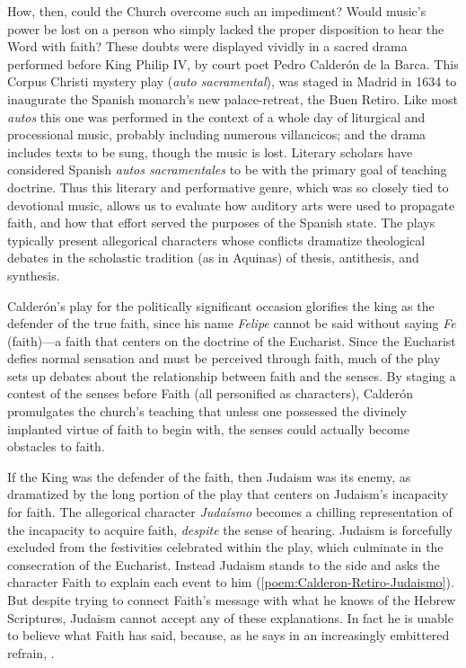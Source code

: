 How, then, could the Church overcome such an impediment?
Would music's power be lost on a person who simply lacked the proper disposition
to hear the Word with faith?
These doubts were displayed vividly in a sacred drama performed before King
Philip IV,  by court poet Pedro Calderón de
la Barca.%
    \Autocite{Calderon:Retiro}
This Corpus Christi mystery play (\emph{auto sacramental}), was staged in Madrid
in 1634 to inaugurate the Spanish monarch's new palace-retreat, the Buen Retiro.
Like most \emph{autos} this one was performed in the context of a whole day of
liturgical and processional music, probably including numerous villancicos; and
the drama includes texts to be sung, though the music is lost.
Literary scholars have considered Spanish \emph{autos sacramentales} to be
 with the primary goal of teaching
doctrine.
Thus this literary and performative genre, which was so closely tied to
devotional music, allows us to evaluate how auditory arts were used to propagate
faith, and how that effort served the purposes of the Spanish state.
The plays typically present allegorical characters whose conflicts dramatize
theological debates in the scholastic tradition (as in Aquinas) of thesis,
antithesis, and synthesis.

Calderón's play for the politically significant occasion glorifies the king as
the defender of the true faith, since his name \emph{Felipe} cannot be said
without saying \emph{Fe} (faith)---a faith that centers on the doctrine of the
Eucharist.%
    \Autocite[\poemline{\XXX}]{Calderon:Retiro}
Since the Eucharist defies normal sensation and must be perceived through faith,
much of the play sets up debates about the relationship between faith and the
senses.
By staging a contest of the senses before Faith (all personified as characters),
Calderón promulgates the church's teaching that unless one possessed the
divinely implanted virtue of faith to begin with, the senses could actually
become obstacles to faith.

If the King was the defender of the faith, then Judaism was its enemy, as
dramatized by the long portion of the play that centers on Judaism's incapacity
for faith.
The allegorical character \emph{Judaísmo} becomes a chilling representation of
the incapacity to acquire faith, \emph{despite} the sense of hearing.
Judaism is forcefully excluded from the festivities celebrated within the play,
which culminate in the consecration of the Eucharist.
Instead Judaism stands to the side and asks the character Faith to explain each
event to him (\cref{poem:Calderon-Retiro-Judaismo}).
But despite trying to connect Faith's message with what he knows of the Hebrew
Scriptures, Judaism cannot accept any of these explanations.
In fact he is unable to believe what Faith has said, because, as he says in an
increasingly embittered refrain, .

